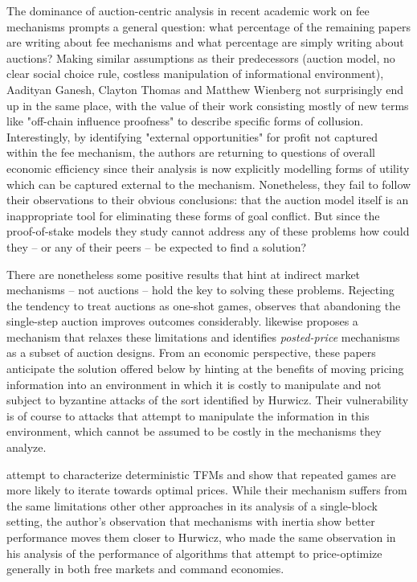 The dominance of auction-centric analysis in recent academic work on fee mechanisms prompts a general question: what percentage of the remaining papers are writing about fee mechanisms and what percentage are simply writing about auctions? Making similar assumptions as their predecessors (auction model, no clear social choice rule, costless manipulation of informational environment), Aadityan Ganesh, Clayton Thomas and Matthew Wienberg not surprisingly end up in the same place, with the value of their work consisting mostly of new terms like "off-chain influence proofness" to describe specific forms of collusion. Interestingly, by identifying "external opportunities" for profit not captured within the fee mechanism, the authors are returning to questions of overall economic efficiency since their analysis is now explicitly modelling forms of utility which can be captured external to the mechanism. Nonetheless, they fail to follow their observations to their obvious conclusions: that the auction model itself is an inappropriate tool for eliminating these forms of goal conflict. But since the proof-of-stake models they study cannot address any of these problems how could they -- or any of their peers -- be expected to find a solution?

There are nonetheless some positive results that hint at indirect market mechanisms -- not auctions -- hold the key to solving these problems. Rejecting the tendency to treat auctions as one-shot games, \citet{ferreira2021dynamic} observes that abandoning the single-step auction improves outcomes considerably. \citet{chen2022bayesian} likewise proposes a mechanism that relaxes these limitations and identifies \textit{posted-price} mechanisms as a subset of auction designs. From an economic perspective, these papers anticipate the solution offered below by hinting at the benefits of moving pricing information into an environment in which it is costly to manipulate and not subject to byzantine attacks of the sort identified by Hurwicz. Their vulnerability is of course to attacks that attempt to manipulate the information in this environment, which cannot be assumed to be costly in the mechanisms they analyze.

\citet{gafni2024barriers} attempt to characterize deterministic TFMs and show that repeated games are more likely to iterate towards optimal prices. While their mechanism suffers from the same limitations other other approaches in its analysis of a single-block setting, the author's observation that mechanisms with inertia show better performance moves them closer to Hurwicz, who made the same observation in his analysis of the performance of algorithms that attempt to price-optimize generally in both free markets and command economies.

